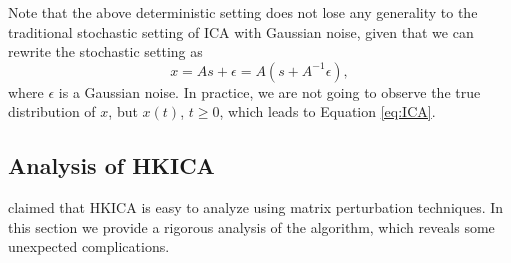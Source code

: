\documentclass[jmlr]{article}
\theoremstyle{definition}
\newcommand{\eps}{\epsilon}
\begin{document}
Note that the above deterministic setting does not lose any generality to the traditional stochastic setting of ICA with Gaussian noise, given that we can rewrite the stochastic setting as 
\[
x = As+\eps = A(s+A^{-1}\eps),
\] 
where $\eps$ is a Gaussian noise. In practice, we are not going to observe the true distribution of $x$, but $x(t)$, $t\ge 0$, which leads to Equation \eqref{eq:ICA}.
\fi


\subsection{Analysis of HKICA}
\label{sec:AnalysisHK}

\citet{hsu2013learning} claimed that HKICA is easy to analyze using matrix perturbation techniques. In this section we provide a rigorous analysis of the algorithm, which reveals some unexpected complications.
\end{document}
